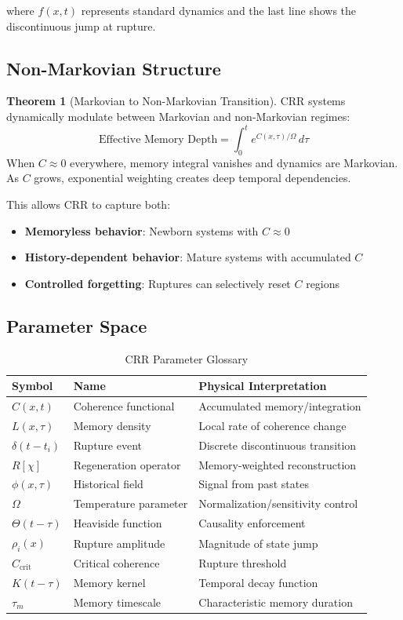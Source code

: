 \documentclass[11pt,a4paper]{article}
\theoremstyle{definition}
\newtheorem{theorem}{Theorem}[section]
\theoremstyle{remark}
\begin{document}
where $f(x,t)$ represents standard dynamics and the last line shows the discontinuous jump at rupture.

\subsection{Non-Markovian Structure}

\begin{theorem}[Markovian to Non-Markovian Transition]
CRR systems dynamically modulate between Markovian and non-Markovian regimes:
\begin{equation}
\text{Effective Memory Depth} = \int_0^t e^{C(x,\tau)/\Omega}\,d\tau
\end{equation}
When $C \approx 0$ everywhere, memory integral vanishes and dynamics are Markovian. As $C$ grows, exponential weighting creates deep temporal dependencies.
\end{theorem}

This allows CRR to capture both:
\begin{itemize}
\item \textbf{Memoryless behavior}: Newborn systems with $C \approx 0$
\item \textbf{History-dependent behavior}: Mature systems with accumulated $C$
\item \textbf{Controlled forgetting}: Ruptures can selectively reset $C$ regions
\end{itemize}

\subsection{Parameter Space}

\begin{table}[H]
\centering
\caption{CRR Parameter Glossary}
\label{tab:parameters}
\begin{tabular}{@{}llp{7cm}@{}}
\toprule
\textbf{Symbol} & \textbf{Name} & \textbf{Physical Interpretation} \\
\midrule
$C(x,t)$ & Coherence functional & Accumulated memory/integration \\
$L(x,\tau)$ & Memory density & Local rate of coherence change \\
$\delta(t-t_i)$ & Rupture event & Discrete discontinuous transition \\
$R[\chi]$ & Regeneration operator & Memory-weighted reconstruction \\
$\phi(x,\tau)$ & Historical field & Signal from past states \\
$\Omega$ & Temperature parameter & Normalization/sensitivity control \\
$\Theta(t-\tau)$ & Heaviside function & Causality enforcement \\
$\rho_i(x)$ & Rupture amplitude & Magnitude of state jump \\
$C_{\text{crit}}$ & Critical coherence & Rupture threshold \\
$K(t-\tau)$ & Memory kernel & Temporal decay function \\
$\tau_m$ & Memory timescale & Characteristic memory duration \\
\bottomrule
\end{tabular}
\end{table}
\end{document}
